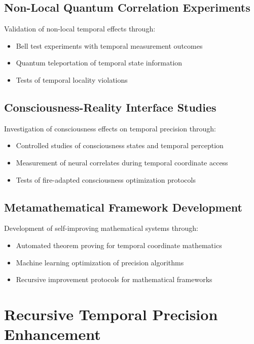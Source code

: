 \documentclass[11pt]{article}
\theoremstyle{remark}
\begin{document}
\subsection{Non-Local Quantum Correlation Experiments}

Validation of non-local temporal effects through:

\begin{itemize}
\item Bell test experiments with temporal measurement outcomes
\item Quantum teleportation of temporal state information
\item Tests of temporal locality violations
\end{itemize}

\subsection{Consciousness-Reality Interface Studies}

Investigation of consciousness effects on temporal precision through:

\begin{itemize}
\item Controlled studies of consciousness states and temporal perception
\item Measurement of neural correlates during temporal coordinate access
\item Tests of fire-adapted consciousness optimization protocols
\end{itemize}

\subsection{Metamathematical Framework Development}

Development of self-improving mathematical systems through:

\begin{itemize}
\item Automated theorem proving for temporal coordinate mathematics
\item Machine learning optimization of precision algorithms
\item Recursive improvement protocols for mathematical frameworks
\end{itemize}

\section{Recursive Temporal Precision Enhancement}
\end{document}
